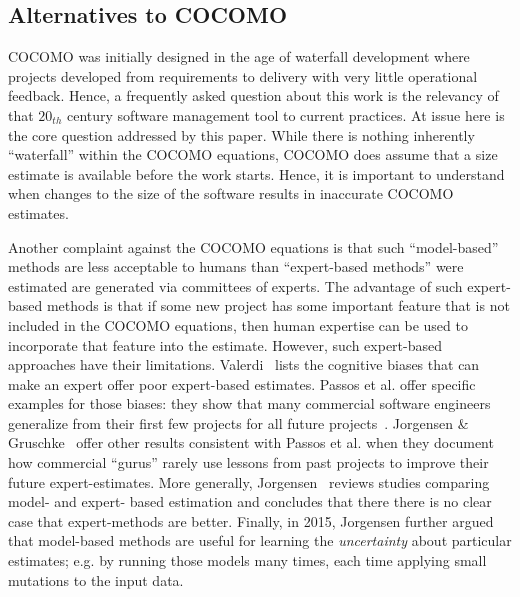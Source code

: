 \documentclass[final,twocolumn,5p]{elsarticle}
\begin{document}
 \subsection{Alternatives to COCOMO}

 
COCOMO was initially designed in the age of
waterfall development where projects developed from
requirements to delivery with very little
operational feedback.  Hence, a frequently asked
question about this work is the relevancy of that
$20_{th}$ century software management tool to
current practices.  At issue here is the core
question addressed by this paper.  While there is
nothing inherently ``waterfall'' within the COCOMO
equations, COCOMO does assume that a size estimate
is available before the work starts.  Hence, it is
important to understand when changes to the size of
the software results in inaccurate COCOMO estimates.

Another complaint against the COCOMO equations is
that such ``model-based'' methods are less
acceptable to humans than ``expert-based methods''
were estimated are generated via committees of
experts. The advantage of such expert-based methods
is that if some new project has some important
feature that is not included in the COCOMO
equations, then human expertise can be used to
incorporate that feature into the estimate.
However,
such expert-based approaches have their limitations.
Valerdi~\cite{valerdi11} lists the cognitive biases
that can make an expert offer poor expert-based estimates.
Passos et al. offer specific examples for those
biases: they show that many commercial software
engineers generalize from their first few projects
for all future projects~\cite{passos11}.  Jorgensen
\& Gruschke~\cite{jorgensen09} offer other results
consistent with Passos et al.  when they document
how commercial ``gurus'' rarely use lessons from
past projects to improve their future
expert-estimates.  More generally,
Jorgensen~\cite{Jorgensen2004} reviews studies
comparing model- and expert- based estimation and
concludes that there there is no clear case that
expert-methods are better.  Finally, in 2015,
Jorgensen further argued~\cite{jorg15} that
model-based methods are useful for learning the {\em
  uncertainty} about particular estimates; e.g.  by
running those models many times, each time applying
small mutations to the input data.
\end{document}
